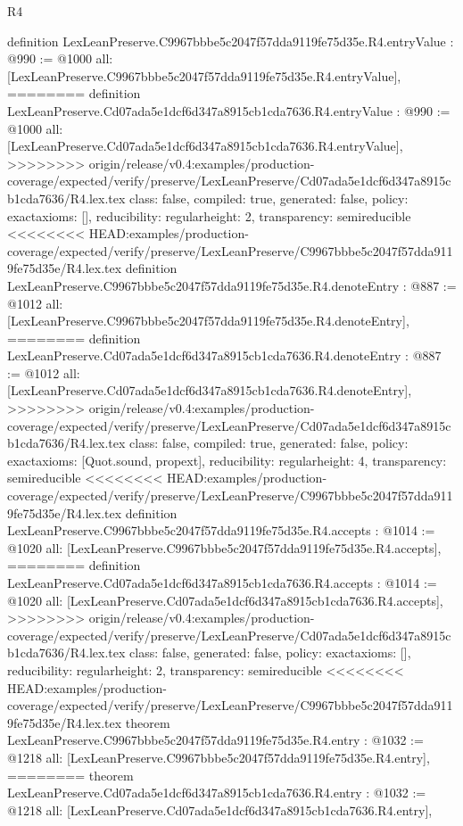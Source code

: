 \begin{lexlean}{R4}
\begin{coremodule}
{{{{{{{{{{{{{{definition LexLeanPreserve.C9967bbbe5c2047f57dda9119fe75d35e.R4.entryValue : @990 := @1000 {
  all: [LexLeanPreserve.C9967bbbe5c2047f57dda9119fe75d35e.R4.entryValue],
========
definition LexLeanPreserve.Cd07ada5e1dcf6d347a8915cb1cda7636.R4.entryValue : @990 := @1000 {
  all: [LexLeanPreserve.Cd07ada5e1dcf6d347a8915cb1cda7636.R4.entryValue],
>>>>>>>> origin/release/v0.4:examples/production-coverage/expected/verify/preserve/LexLeanPreserve/Cd07ada5e1dcf6d347a8915cb1cda7636/R4.lex.tex
  class: false,
  compiled: true,
  generated: false,
  policy: exact{axioms: []},
  reducibility: regular{height: 2},
  transparency: semireducible
}
<<<<<<<< HEAD:examples/production-coverage/expected/verify/preserve/LexLeanPreserve/C9967bbbe5c2047f57dda9119fe75d35e/R4.lex.tex
definition LexLeanPreserve.C9967bbbe5c2047f57dda9119fe75d35e.R4.denoteEntry : @887 := @1012 {
  all: [LexLeanPreserve.C9967bbbe5c2047f57dda9119fe75d35e.R4.denoteEntry],
========
definition LexLeanPreserve.Cd07ada5e1dcf6d347a8915cb1cda7636.R4.denoteEntry : @887 := @1012 {
  all: [LexLeanPreserve.Cd07ada5e1dcf6d347a8915cb1cda7636.R4.denoteEntry],
>>>>>>>> origin/release/v0.4:examples/production-coverage/expected/verify/preserve/LexLeanPreserve/Cd07ada5e1dcf6d347a8915cb1cda7636/R4.lex.tex
  class: false,
  compiled: true,
  generated: false,
  policy: exact{axioms: [Quot.sound, propext]},
  reducibility: regular{height: 4},
  transparency: semireducible
}
<<<<<<<< HEAD:examples/production-coverage/expected/verify/preserve/LexLeanPreserve/C9967bbbe5c2047f57dda9119fe75d35e/R4.lex.tex
definition LexLeanPreserve.C9967bbbe5c2047f57dda9119fe75d35e.R4.accepts : @1014 := @1020 {
  all: [LexLeanPreserve.C9967bbbe5c2047f57dda9119fe75d35e.R4.accepts],
========
definition LexLeanPreserve.Cd07ada5e1dcf6d347a8915cb1cda7636.R4.accepts : @1014 := @1020 {
  all: [LexLeanPreserve.Cd07ada5e1dcf6d347a8915cb1cda7636.R4.accepts],
>>>>>>>> origin/release/v0.4:examples/production-coverage/expected/verify/preserve/LexLeanPreserve/Cd07ada5e1dcf6d347a8915cb1cda7636/R4.lex.tex
  class: false,
  generated: false,
  policy: exact{axioms: []},
  reducibility: regular{height: 2},
  transparency: semireducible
}
<<<<<<<< HEAD:examples/production-coverage/expected/verify/preserve/LexLeanPreserve/C9967bbbe5c2047f57dda9119fe75d35e/R4.lex.tex
theorem LexLeanPreserve.C9967bbbe5c2047f57dda9119fe75d35e.R4.entry : @1032 := @1218 {
  all: [LexLeanPreserve.C9967bbbe5c2047f57dda9119fe75d35e.R4.entry],
========
theorem LexLeanPreserve.Cd07ada5e1dcf6d347a8915cb1cda7636.R4.entry : @1032 := @1218 {
  all: [LexLeanPreserve.Cd07ada5e1dcf6d347a8915cb1cda7636.R4.entry],
}}}}}}}}}}}}}}}}}}}
\end{coremodule}
\end{lexlean}
